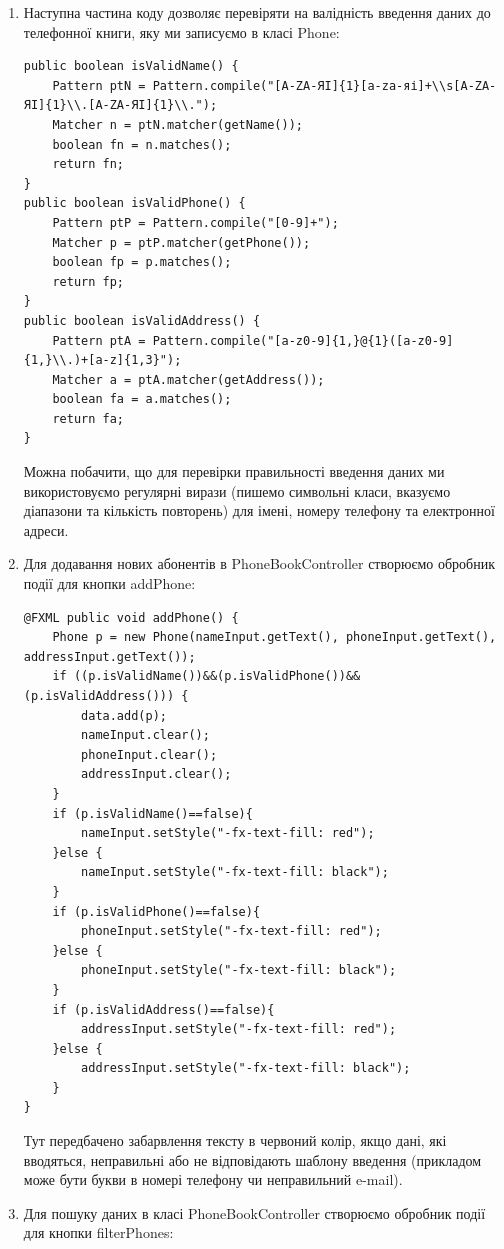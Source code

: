 \begin{enumerate}
\begin{verbatim}
}
\end{verbatim}
	\item Наступна частина коду дозволяє перевіряти на валідність введення даних до телефонної книги, яку ми записуємо в класі Phone:
\begin{verbatim}
public boolean isValidName() {
	Pattern ptN = Pattern.compile("[A-ZА-ЯІ]{1}[a-zа-яі]+\\s[A-ZА-ЯІ]{1}\\.[A-ZА-ЯІ]{1}\\.");
	Matcher n = ptN.matcher(getName());
	boolean fn = n.matches();
	return fn;
}
public boolean isValidPhone() {
	Pattern ptP = Pattern.compile("[0-9]+");
	Matcher p = ptP.matcher(getPhone());
	boolean fp = p.matches();
	return fp;
}
public boolean isValidAddress() {
	Pattern ptA = Pattern.compile("[a-z0-9]{1,}@{1}([a-z0-9]{1,}\\.)+[a-z]{1,3}");
	Matcher a = ptA.matcher(getAddress());
	boolean fa = a.matches();
	return fa;
}
\end{verbatim}
		Можна побачити, що для перевірки правильності введення даних ми використовуємо регулярні вирази (пишемо символьні класи, вказуємо діапазони та кількість повторень) для імені, номеру телефону та електронної адреси.
	\item Для додавання нових абонентів в PhoneBookController створюємо обробник події для кнопки addPhone:
\begin{verbatim}
@FXML public void addPhone() {
	Phone p = new Phone(nameInput.getText(), phoneInput.getText(), addressInput.getText());
	if ((p.isValidName())&&(p.isValidPhone())&&(p.isValidAddress())) {
		data.add(p);
		nameInput.clear();
		phoneInput.clear();
		addressInput.clear();
	}
	if (p.isValidName()==false){
		nameInput.setStyle("-fx-text-fill: red");
	}else {
		nameInput.setStyle("-fx-text-fill: black");
	}
	if (p.isValidPhone()==false){
		phoneInput.setStyle("-fx-text-fill: red");
	}else {
		phoneInput.setStyle("-fx-text-fill: black");
	}
	if (p.isValidAddress()==false){
		addressInput.setStyle("-fx-text-fill: red");
	}else {
		addressInput.setStyle("-fx-text-fill: black");
	}
}
\end{verbatim}
		Тут передбачено забарвлення тексту в червоний колір, якщо дані, які вводяться, неправильні або не відповідають шаблону введення (прикладом може бути букви в номері телефону чи неправильний e-mail).
	\item Для пошуку даних в класі PhoneBookController створюємо обробник події для кнопки filterPhones:
\begin{verbatim}

\end{verbatim}
\end{enumerate}
